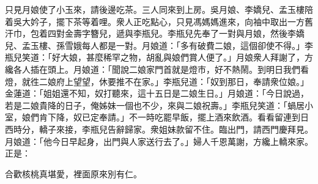 只見月娘使了小玉來，請後邊吃茶。三人同來到上房。吳月娘、李嬌兒、孟玉樓陪着吳大妗子，擺下茶等着哩。衆人正吃點心，只見馮媽媽進來，向袖中取出一方舊汗巾，包着四對金壽字簪兒，遞與李瓶兒。李瓶兒先奉了一對與月娘，然後李嬌兒、孟玉樓、孫雪娥每人都是一對。月娘道：「多有破費二娘，這個卻使不得。」李瓶兒笑道：「好大娘，甚麼稀罕之物，胡亂與娘們賞人便了。」月娘衆人拜謝了，方纔各人插在頭上。月娘道：「聞說二娘家門首就是燈市，好不熱鬧。到明日我們看燈，就徃二娘府上望望，休要推不在家。」李瓶兒道：「奴到那日，奉請衆位娘。」金蓮道：「姐姐還不知，奴打聽來，這十五日是二娘生日。」月娘道：「今日說過，若是二娘貴降的日子，俺姊妹一個也不少，來與二娘祝壽。」李瓶兒笑道：「蝸居小室，娘們肯下降，奴已定奉請。」不一時吃罷早飯，擺上酒來飲酒。看看留連到日西時分，轎子來接，李瓶兒告辭歸家。衆姐妹款留不住。臨出門，請西門慶拜見。月娘道：「他今日早起身，出門與人家送行去了。」婦人千恩萬謝，方纔上轎來家。正是：

\begin{myquote}
合歡核桃真堪愛，裡面原來別有仁。
\end{myquote}

